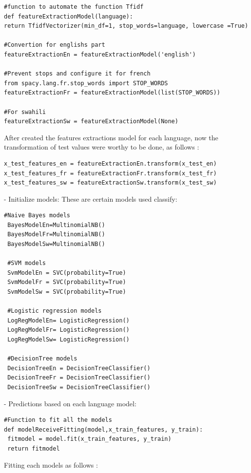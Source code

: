 \documentclass[12pt,a4paper, oneside]{book}
\begin{document}
\begin{lstlisting}[style=stylejupyter]
#function to automate the function Tfidf 
def featureExtractionModel(language):
return TfidfVectorizer(min_df=1, stop_words=language, lowercase =True)   
 	
#Convertion for englishs part
featureExtractionEn = featureExtractionModel('english')
 	
#Prevent stops and configure it for french
from spacy.lang.fr.stop_words import STOP_WORDS
featureExtractionFr = featureExtractionModel(list(STOP_WORDS))  
 	
#For swahili
featureExtractionSw = featureExtractionModel(None) 
 \end{lstlisting}
 After created the features extractions model for each language, now the transformation of test values were worthy to be done, as follows :
 \begin{lstlisting}[style=stylejupyter]
x_test_features_en = featureExtractionEn.transform(x_test_en)
x_test_features_fr = featureExtractionFr.transform(x_test_fr)
x_test_features_sw = featureExtractionSw.transform(x_test_sw)
 \end{lstlisting}  
 
 - Initialize models: These are certain models used classify:
 \begin{lstlisting}[style=stylejupyter]
 #Naive Bayes models
 BayesModelEn=MultinomialNB()  
 BayesModelFr=MultinomialNB() 
 BayesModelSw=MultinomialNB() 
 
 #SVM models
 SvmModelEn = SVC(probability=True)
 SvmModelFr = SVC(probability=True)
 SvmModelSw = SVC(probability=True)
 
 #Logistic regression models
 LogRegModelEn= LogisticRegression() 
 LogRegModelFr= LogisticRegression() 
 LogRegModelSw= LogisticRegression() 
 
 #DecisionTree models
 DecisionTreeEn = DecisionTreeClassifier()
 DecisionTreeFr = DecisionTreeClassifier()
 DecisionTreeSw = DecisionTreeClassifier()
 \end{lstlisting}

- Predictions based on each language model: 
\begin{lstlisting}[style=stylejupyter]
#Function to fit all the models
def modelReceiveFitting(model,x_train_features, y_train):
 fitmodel = model.fit(x_train_features, y_train)
 return fitmodel
\end{lstlisting}
Fitting each models as follows :
 
\end{document}
